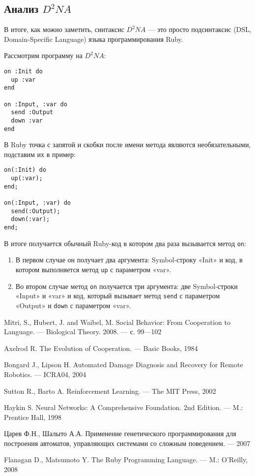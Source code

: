\documentclass[utf8,a5paper,portrait,12pt]{eskdtext}
\begin{document}
\newpage
\subsection{Анализ $D^2NA$}

В итоге, как можно заметить, синтаксис $D^2NA$ — это просто подсинтаксис
(DSL, Domain-Specific Language) языка программирования Ruby.

Рассмотрим программу на $D^2NA$:
\begin{verbatim}
on :Init do
  up :var
end

on :Input, :var do
  send :Output
  down :var
end
\end{verbatim}

В Ruby точка с запятой и скобки после имени метода являются необязательными,
подставим их в пример:
\begin{verbatim}
on(:Init) do
  up(:var);
end;

on(:Input, :var) do
  send(:Output);
  down(:var);
end;
\end{verbatim}

В итоге получается обычный Ruby-код в котором два раза вызывается метод
\texttt{on}:
\begin{enumerate}
  \item В первом случае он получает два аргумента: Symbol-строку «Init» и код,
        в котором выполняется метод \texttt{up} с параметром «var».
  \item Во втором случае метод \texttt{on} получается три аргумента: две
        Symbol-строки «Input» и «var» и код, который вызывает метод
        \texttt{send} с параметром «Output» и \texttt{down} с параметром «var».
\end{enumerate}

\newpage
\begin{thebibliography}{}

    Mitri, S., Hubert, J. and Waibel, M. Social Behavior: From Cooperation to
    Language. — Biological Theory. 2008. — с. 99—102

    Axelrod R. The Evolution of Cooperation. — Basic Books, 1984

    Bongard J., Lipson H. Automated Damage Diagnosis and Recovery for Remote
    Robotics. — ICRA04, 2004

    Sutton R., Barto A. Reinforcement Learning. — The MIT Press, 2002

    Haykin S. Neural Networks: A Comprehensive Foundation. 2nd Edition. — M.: Prentice Hall, 1998

    Царев Ф.Н., Шалыто А.А. Применение генетического программирования для
    построения автоматов, управляющих системами со сложным поведением. — 2007
  
      Flanagan D., Matsumoto Y. The Ruby Programming Language. — M.: O'Reilly, 2008

\end{thebibliography}
\end{document}
